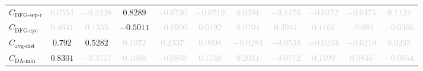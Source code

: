 \documentclass{standalone}
\newcommand{\daminname}{\text{DA-min}}
\newcommand{\damin}{C_{\daminname}}
\newcommand{\dfgseprationame}{\text{DFG-sep-r}}
\newcommand{\dfgsepratio}{C_{\dfgseprationame}}
\newcommand{\dfgcycname}{\text{DFG-cyc}}
\newcommand{\dfgcyc}{C_{\dfgcycname}}
\newcommand{\avgdistname}{\text{avg-dist}}
\newcommand{\avgdist}{C_{\avgdistname}}
\begin{document}
\begin{tabular}{lcccccccccc}
$\dfgsepratio$ & \textcolor{lightgray}{$0.0554$} & \textcolor{lightgray}{$-0.2228$} & $0.8289$ & \textcolor{lightgray}{$-0.0736$} & \textcolor{lightgray}{$-0.0719$} & \textcolor{lightgray}{$0.0591$} & \textcolor{lightgray}{$-0.1176$} & \textcolor{lightgray}{$-0.0372$} & \textcolor{lightgray}{$-0.0475$} & \textcolor{lightgray}{$0.1124$} \\ 
$\dfgcyc$ & \textcolor{lightgray}{$0.4641$} & \textcolor{lightgray}{$0.1355$} & $-0.5011$ & \textcolor{lightgray}{$-0.0906$} & \textcolor{lightgray}{$0.0192$} & \textcolor{lightgray}{$0.0704$} & \textcolor{lightgray}{$0.3914$} & \textcolor{lightgray}{$0.1161$} & \textcolor{lightgray}{$-0.081$} & \textcolor{lightgray}{$-0.0366$} \\ 
$\avgdist$ & $0.792$ & $0.5282$ & \textcolor{lightgray}{$0.1072$} & \textcolor{lightgray}{$0.2337$} & \textcolor{lightgray}{$0.0898$} & \textcolor{lightgray}{$-0.0284$} & \textcolor{lightgray}{$-0.0538$} & \textcolor{lightgray}{$-0.0233$} & \textcolor{lightgray}{$-0.0219$} & \textcolor{lightgray}{$0.0235$} \\ 
$\damin$ & $0.8301$ & \textcolor{lightgray}{$-0.3717$} & \textcolor{lightgray}{$0.1068$} & \textcolor{lightgray}{$-0.0898$} & \textcolor{lightgray}{$0.1748$} & \textcolor{lightgray}{$0.2041$} & \textcolor{lightgray}{$-0.0772$} & \textcolor{lightgray}{$0.1099$} & \textcolor{lightgray}{$0.0845$} & \textcolor{lightgray}{$-0.0854$} \\ 
\bottomrule
\end{tabular}
\end{document}
